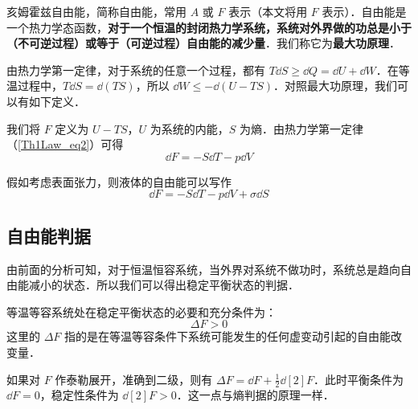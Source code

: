 

亥姆霍兹自由能，简称自由能，常用 $A$ 或 $F$ 表示（本文将用 $F$ 表示）．自由能是一个热力学态函数，\textbf{对于一个恒温的封闭热力学系统，系统对外界做的功总是小于（不可逆过程）或等于（可逆过程）自由能的减少量}．我们称它为\textbf{最大功原理}．

由热力学第一定律，对于系统的任意一个过程，都有 $T\dd S\ge \dd Q=\dd U+\dd W$．在等温过程中，$T\dd S=\dd (TS)$，所以 $\dd W\le - \dd (U-TS)$．对照最大功原理，我们可以有如下定义．

我们将 $F$ 定义为 $U-TS$，$U$ 为系统的内能，$S$ 为熵．由热力学第一定律（\autoref{Th1Law_eq2}）可得
\begin{equation}
\dd F=-S\dd T-p\dd V
\end{equation}

假如考虑表面张力，则液体的自由能可以写作
\begin{equation}
\dd F=-S\dd T-p \dd V+\sigma \dd S
\end{equation}
\subsection{自由能判据}
由前面的分析可知，对于恒温恒容系统，当外界对系统不做功时，系统总是趋向自由能减小的状态．所以我们可以得出稳定平衡状态的判据．

等温等容系统处在稳定平衡状态的必要和充分条件为：
\begin{equation}
\Delta F>0
\end{equation}
这里的 $\Delta F$ 指的是在等温等容条件下系统可能发生的任何虚变动引起的自由能改变量．

如果对 $F$ 作泰勒展开，准确到二级，则有 $\Delta F=\dd F+\frac{1}{2}\dd[2]{F}$．此时平衡条件为 $\dd F=0$，稳定性条件为 $\dd[2]{F}>0$．这一点与熵判据的原理一样．
